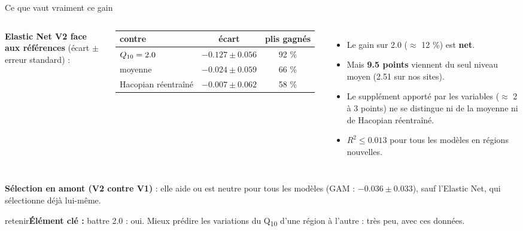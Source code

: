 \documentclass[aspectratio=169,10pt]{beamer}
\newcommand{\retenir}[1]{\vfill\begin{beamercolorbox}[sep=5pt,rounded=true]{retenir}\small\textbf{Élément clé :} #1\end{beamercolorbox}}
\newcommand{\Qdix}{Q\textsubscript{10}}
\begin{document}
\begin{frame}{Ce que vaut vraiment ce gain}
  \begin{columns}[t]
      \small
      \textbf{Elastic Net V2 face aux références} (écart $\pm$ erreur standard) :

      \vspace{0.1cm}
      \footnotesize
      \begin{tabular}{lcc}
        \toprule
        contre & écart & plis gagnés \\
        \midrule
        $\Qdix=2.0$ & $-0.127 \pm 0.056$ & 92 \% \\
        moyenne & $-0.024 \pm 0.059$ & 66 \% \\
        Hacopian réentraîné & $-0.007 \pm 0.062$ & 58 \% \\
        \bottomrule
      \end{tabular}
      \small
      \begin{itemize}
        \item Le gain sur 2.0 ($\approx$ 12 \%) est \textbf{net}.
        \item Mais \textbf{9.5 points} viennent du seul niveau moyen (2.51 sur nos sites).
        \item Le supplément apporté par les variables ($\approx$ 2 à 3 points) ne se distingue ni de la moyenne ni de Hacopian réentraîné.
        \item $R^2 \le 0.013$ pour tous les modèles en régions nouvelles.
      \end{itemize}
  \end{columns}
  \vspace{0.2cm}
  \small\textbf{Sélection en amont (V2 contre V1)} : elle aide ou est neutre pour tous les modèles (GAM : $-0.036 \pm 0.033$), sauf l'Elastic Net, qui sélectionne déjà lui-même.
  \retenir{battre 2.0 : oui. Mieux prédire les variations du \Qdix{} d'une région à l'autre : très peu, avec ces données.}
\end{frame}
\end{document}
